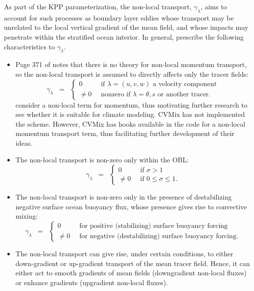 As part of the KPP parameterization, the non-local transport,
$\gamma_{\lambda}$, aims to account for such processes as boundary
layer eddies whose transport may be unrelated to the local vertical
gradient of the mean field, and whose impacts may penetrate within the
stratified ocean interior. In general, \cite{LargeKPP} prescribe the
following characteristics to $\gamma_{\lambda}$.
\begin{itemize}

\item Page 371 of \citep{LargeKPP} notes that there is no theory for
  non-local momentum transport, so the non-local transport is assumed
  to directly affects only the tracer fields:
\begin{equation}
 \gamma_{\lambda} \; \; = \; \; 
\left\{
 \begin{array}{ll}
  0 \; \;  &\mbox{if $\lambda = (u,v,w)$ a velocity component}
 \\
  \ne 0 \; \; &\mbox{nonzero if $\lambda = \theta,s$ or another tracer.}
  \end{array}
 \right.
\end{equation}
\cite{Smyth_etal2002} consider a non-local term for momentum, thus
motivating further research to see whether it is suitable for climate
modeling.  CVMix has not implemented the \cite{Smyth_etal2002} scheme.
However, CVMix has hooks available in the code for a non-local
momentum transport term, thus facilitating further development of
their ideas.

  \item The non-local transport is non-zero only within the OBL:  
\begin{equation}
 \gamma_{\lambda} \; \; = \; \; 
  \left\{ 
  \begin{array}{ll}
   0 \; \; &\mbox{if $\sigma > 1$}
   \\ 
   \ne 0  \; \; &\mbox{if $0 \le \sigma \le 1$.}
  \end{array}
 \right.
\end{equation}

  \item The non-local transport is non-zero only in the presence of
    destabilizing negative surface ocean buoyancy flux, whose presence
    gives rise to convective mixing:
\begin{equation}
 \gamma_{\lambda} \; \; = \; \; 
  \left\{ 
  \begin{array}{ll}
   0 \; \; &\mbox{for positive (stabilizing) surface buoyancy forcing}
   \\ 
   \ne 0  \; \; &\mbox{for negative (destabilizing) surface buoyancy forcing.}
  \end{array}
 \right.
\end{equation}

  \item The non-local transport can give rise, under
    certain conditions, to either down-gradient or up-gradient
    transport of the mean tracer field. Hence, it can either act to
    smooth gradients of mean fields (downgradient non-local fluxes) or
    enhance gradients (upgradient non-local fluxes).

\end{itemize}
